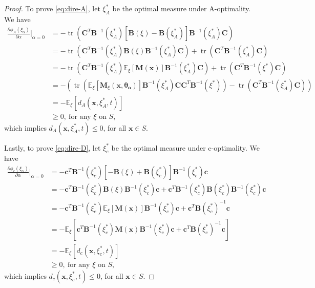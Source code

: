\documentclass[
]{book}
\theoremstyle{definition}
\theoremstyle{definition}
\theoremstyle{definition}
\theoremstyle{definition}
\theoremstyle{remark}
\begin{document}
\begin{proof}
To prove \eqref{eq:dire-A}, let \(\xi_A^*\) be the optimal measure under A-optimality. We have
\begin{align*}
    \frac{\partial \phi_A(\xi_\alpha)}{\partial \alpha}\Big|_{\alpha=0} 
    &=-\operatorname{tr}(\boldsymbol{C}^T\boldsymbol{B}^{-1}(\xi_A^*)[\boldsymbol{B}(\xi)-\boldsymbol{B}(\xi_A^*)]\boldsymbol{B}^{-1}(\xi_A^*)\boldsymbol{C})\\
    &=-\operatorname{tr}(\boldsymbol{C}^T\boldsymbol{B}^{-1}(\xi_A^*)\boldsymbol{B}(\xi)\boldsymbol{B}^{-1}(\xi_A^*)\boldsymbol{C})+\operatorname{tr}(\boldsymbol{C}^T\boldsymbol{B}^{-1}(\xi_A^*)\boldsymbol{C})\\
    &=-\operatorname{tr}(\boldsymbol{C}^T\boldsymbol{B}^{-1}(\xi_A^*)\mathbb{E}_{\xi}[\boldsymbol{M}(\boldsymbol{x})]\boldsymbol{B}^{-1}(\xi_A^*)\boldsymbol{C}) +\operatorname{tr}(\boldsymbol{C}^T\boldsymbol{B}^{-1}(\xi^*)\boldsymbol{C})\\
    &= - (\operatorname{tr}(\mathbb{E}_{\xi}[\boldsymbol{M}_{\xi}(\boldsymbol{x},\boldsymbol{\theta_o})]\boldsymbol{B}^{-1}(\xi_A^*)\boldsymbol{C}\boldsymbol{C}^T\boldsymbol{B}^{-1}(\xi^*))-\operatorname{tr}(\boldsymbol{C}^T\boldsymbol{B}^{-1}(\xi_A^*)\boldsymbol{C}) )\\
    &= -\mathbb{E}_{\xi}[d_A(\boldsymbol{x},\xi_A^*,t)]\\
    &\geq 0,~ \text{for any } \xi \text{ on } S,
    \end{align*}
which implies \(d_A(\boldsymbol{x},\xi_A^*,t)\leq 0\), for all \(\boldsymbol{x} \in S\).

Lastly, to prove \eqref{eq:dire-D}, let \(\xi_c^*\) be the optimal measure under c-optimality. We have
\begin{align*}
    \frac{\partial \phi_c(\xi_\alpha)}{\partial \alpha}\Big|_{\alpha=0} 
    &=-\boldsymbol{c}^T\boldsymbol{B}^{-1}(\xi_c^*)[-\boldsymbol{B}(\xi)+\boldsymbol{B}(\xi_c^*)]\boldsymbol{B}^{-1}(\xi_c^*)\boldsymbol{c}\\
    &=-\boldsymbol{c}^T\boldsymbol{B}^{-1}(\xi_c^*)\boldsymbol{B}(\xi)\boldsymbol{B}^{-1}(\xi_c^*)\boldsymbol{c}+\boldsymbol{c}^T\boldsymbol{B}^{-1}(\xi_c^*)\boldsymbol{B}(\xi_c^*)\boldsymbol{B}^{-1}(\xi_c^*)\boldsymbol{c}\\
    &=-\boldsymbol{c}^T\boldsymbol{B}^{-1}(\xi_c^*)\mathbb{E}_{\xi}[\boldsymbol{M}(\boldsymbol{x})]\boldsymbol{B}^{-1}(\xi_c^*)\boldsymbol{c}+\boldsymbol{c}^T\boldsymbol{B}(\xi_c^*)^{-1}\boldsymbol{c}\\
    &=-\mathbb{E}_{\xi}[\boldsymbol{c}^T\boldsymbol{B}^{-1}(\xi_c^*)\boldsymbol{M}(\boldsymbol{x}) \boldsymbol{B}^{-1}(\xi_c^*)\boldsymbol{c}+\boldsymbol{c}^T\boldsymbol{B}(\xi_c^*)^{-1}\boldsymbol{c}]\\
    &=-\mathbb{E}_{\xi}[d_c(\boldsymbol{x},\xi_c^*,t)]\\
    &\geq 0,~ \text{for any } \xi \text{ on } S,
    \end{align*}
which implies \(d_c(\boldsymbol{x},\xi_c^*,t)\leq 0\), for all \(\boldsymbol{x} \in S\).
\end{proof}
\end{document}
